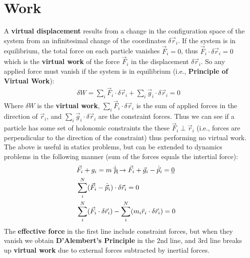 \documentclass[conference]{IEEEtran}
\begin{document}
\section{Work}
A \textbf{virtual displacement} results from a change in the configuration space of the system from an infinitesimal change of the coordinates $\delta \vec{r}_i$. If the system is in equilibrium, the total force on each particle vanishes $\vec{F}_i = 0$, thus $\vec{F}_i \cdot \delta \vec{r}_i = 0$ which is the \textbf{virtual work} of the force $\vec{F}_i$ in the displacement $\delta \vec{r}_i$. So any applied force must vanish if the system is in equilibrium (i.e., \textbf{Principle of Virtual Work}):
\begin{align}
    & \delta W = \sum_i \vec{F}_i \cdot \delta \vec{r}_i + \sum_i \vec{g}_i \cdot \delta \vec{r}_i = 0
\end{align}
Where $\delta W$ is the \textbf{virtual work}, $\sum_i \vec{F}_i \cdot \delta \vec{r}_i$ is the sum of applied forces in the direction of $\vec{r}_i$, and $\sum_i \vec{g}_i \cdot \delta \vec{r}_i$ are the constraint forces. Thus we can see if a particle has some set of holonomic constraints the these $\vec{F}_i \perp \vec{r}_i$ (i.e., forces are perpendicular to the direction of the constraint) thus performing no virtual work. The above is useful in statics problems, but can be extended to dynamics problems in the following manner (sum of the forces equals the intertial force):
\begin{align}
    & \vec{F}_i + g_i = m \dot{\vec{p}_i} \to \vec{F}_i + \vec{g}_i - \dot{\vec{p}}_i = \underbar{0} \notag \\
    & \sum_i^N (\vec{F}_i - \dot{\vec{p}}_i) \cdot \delta \vec{r}_i = 0 \\
    & \sum_i^N (\vec{F}_i \cdot \delta \vec{r}_i) - \sum_i^N(m_i \ddot{r}_i \cdot \delta \vec{r}_i) = 0
\end{align}
The \textbf{effective force} in the first line include constraint forces, but when they vanish we obtain \textbf{D'Alembert's Principle} in the 2nd line, and 3rd line breaks up \textbf{virtual work} due to external forces subtracted by inertial forces.
\end{document}
